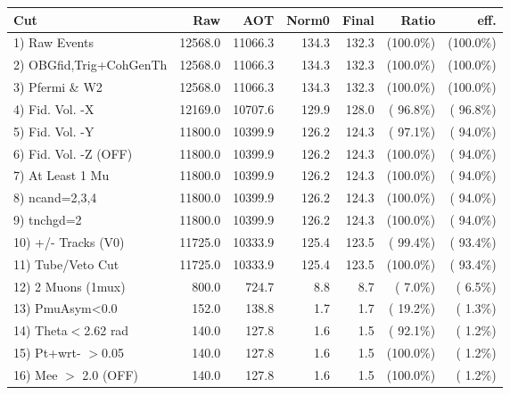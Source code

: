  \begin{table}[h!]\centering
 \begin{tabular}{||l||r|r|r|r|r|r||}
 \hline
 \hline
 Cut & Raw & AOT & Norm0 & Final & Ratio & eff.       \\
 \hline
  1) Raw Events           &      12568.0 &      11066.3 &        134.3 &        132.3 & (100.0\%) & (100.0\%) \\
  2) OBGfid,Trig+CohGenTh &      12568.0 &      11066.3 &        134.3 &        132.3 & (100.0\%) & (100.0\%) \\
  3) Pfermi \& W2         &      12568.0 &      11066.3 &        134.3 &        132.3 & (100.0\%) & (100.0\%) \\
  4) Fid. Vol. -X         &      12169.0 &      10707.6 &        129.9 &        128.0 & ( 96.8\%) & ( 96.8\%) \\
  5) Fid. Vol. -Y         &      11800.0 &      10399.9 &        126.2 &        124.3 & ( 97.1\%) & ( 94.0\%) \\
  6) Fid. Vol. -Z (OFF)   &      11800.0 &      10399.9 &        126.2 &        124.3 & (100.0\%) & ( 94.0\%) \\
  7) At Least 1 Mu        &      11800.0 &      10399.9 &        126.2 &        124.3 & (100.0\%) & ( 94.0\%) \\
  8) ncand=2,3,4          &      11800.0 &      10399.9 &        126.2 &        124.3 & (100.0\%) & ( 94.0\%) \\
  9) tnchgd=2             &      11800.0 &      10399.9 &        126.2 &        124.3 & (100.0\%) & ( 94.0\%) \\
 10) +/- Tracks (V0)      &      11725.0 &      10333.9 &        125.4 &        123.5 & ( 99.4\%) & ( 93.4\%) \\
 11) Tube/Veto Cut        &      11725.0 &      10333.9 &        125.4 &        123.5 & (100.0\%) & ( 93.4\%) \\
 12) 2 Muons (1mux)       &        800.0 &        724.7 &          8.8 &          8.7 & (  7.0\%) & (  6.5\%) \\
 13) PmuAsym<0.0          &        152.0 &        138.8 &          1.7 &          1.7 & ( 19.2\%) & (  1.3\%) \\
 14) Theta$<$2.62 rad     &        140.0 &        127.8 &          1.6 &          1.5 & ( 92.1\%) & (  1.2\%) \\
 15) Pt+wrt- $>$0.05      &        140.0 &        127.8 &          1.6 &          1.5 & (100.0\%) & (  1.2\%) \\
 16) Mee $>$ 2.0  (OFF)   &        140.0 &        127.8 &          1.6 &          1.5 & (100.0\%) & (  1.2\%) \\

\end{tabular}
\end{table}
